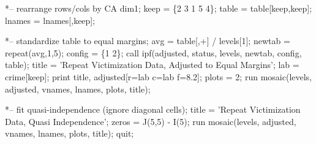 \begin{listing}
   *-- rearrange rows/cols by CA dim1;
   keep = \{2 3 1 5 4\};
   table = table[keep,keep];
   lnames = lnames[,keep];
 
   *-- standardize table to equal margins;
   avg = table[,+] / levels[1];
   newtab = repeat(avg,1,5);
   config = \{1 2\};
   call ipf(adjusted, status, levels, newtab, config, table);
   title  = 'Repeat Victimization Data, Adjusted to Equal Margins';
   lab = crime[keep];
   print title, adjusted[r=lab c=lab f=8.2];
   plots = 2;
   run mosaic(levels, adjusted, vnames, lnames, plots, title);

   *-- fit quasi-independence (ignore diagonal cells);
   title  = 'Repeat Victimization Data, Quasi Independence';
   zeros = J(5,5) - I(5);
   run mosaic(levels, adjusted, vnames, lnames, plots, title);
quit;
\end{listing}
